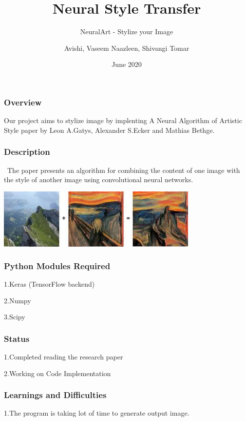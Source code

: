 \documentclass[14pt]{beamer}
\title[NST]{Neural Style Transfer}
\subtitle{NeuralArt - Stylize your Image}
\author[Team - 38]{Avishi, Vaseem Naazleen, Shivangi Tomar}
\date{June 2020}
\begin{document}
\begin{frame}
   \titlepage
\end{frame}

\begin{frame}
		\frametitle{Overview}
		Our project aims to stylize image by implenting A Neural Algorithm of Artistic Style paper by Leon A.Gatys, Alexander S.Ecker and Mathias Bethge.
\end{frame}

\begin{frame}
		\frametitle{Description}
		\ The paper presents an algorithm for combining the content of one image with the style of another image using convolutional neural networks.

		\includegraphics[width=100mm]{image.jpg}
\end{frame}

\begin{frame}
		\frametitle{Python Modules Required}
        \item 1.Keras (TensorFlow backend)
	    \item 2.Numpy
	    \item 3.Scipy
\end{frame}

\begin{frame}
		\frametitle{Status}
        \item 1.Completed reading the research paper
	    \item 2.Working on Code Implementation
\end{frame}

\begin{frame}
		\frametitle{Learnings and Difficulties}
        \item 1.The program is taking lot of time to generate output image.
\end{frame}
\end{document}
